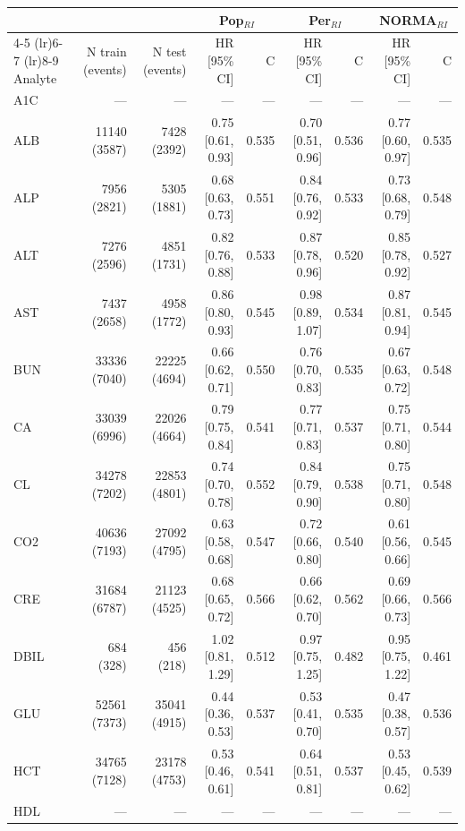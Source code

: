\begin{table}[ht]
\centering
\footnotesize
\begin{tabular}{lrrrrrrrr}
\toprule
 & &  & \multicolumn{2}{c}{Pop$_{RI}$} & \multicolumn{2}{c}{Per$_{RI}$} & \multicolumn{2}{c}{NORMA$_{RI}$} \\
\cmidrule(lr){4-5} \cmidrule(lr){6-7} \cmidrule(lr){8-9}
Analyte & N train (events) & N test (events) & HR [95\% CI] & C & HR [95\% CI] & C & HR [95\% CI] & C \\
\midrule
A1C & --- & --- & --- & --- & --- & --- & --- & --- \\
ALB & 11140 (3587) & 7428 (2392) & 0.75 [0.61, 0.93] & 0.535 & 0.70 [0.51, 0.96] & 0.536 & 0.77 [0.60, 0.97] & 0.535 \\
ALP & 7956 (2821) & 5305 (1881) & 0.68 [0.63, 0.73] & 0.551 & 0.84 [0.76, 0.92] & 0.533 & 0.73 [0.68, 0.79] & 0.548 \\
ALT & 7276 (2596) & 4851 (1731) & 0.82 [0.76, 0.88] & 0.533 & 0.87 [0.78, 0.96] & 0.520 & 0.85 [0.78, 0.92] & 0.527 \\
AST & 7437 (2658) & 4958 (1772) & 0.86 [0.80, 0.93] & 0.545 & 0.98 [0.89, 1.07] & 0.534 & 0.87 [0.81, 0.94] & 0.545 \\
BUN & 33336 (7040) & 22225 (4694) & 0.66 [0.62, 0.71] & 0.550 & 0.76 [0.70, 0.83] & 0.535 & 0.67 [0.63, 0.72] & 0.548 \\
CA & 33039 (6996) & 22026 (4664) & 0.79 [0.75, 0.84] & 0.541 & 0.77 [0.71, 0.83] & 0.537 & 0.75 [0.71, 0.80] & 0.544 \\
CL & 34278 (7202) & 22853 (4801) & 0.74 [0.70, 0.78] & 0.552 & 0.84 [0.79, 0.90] & 0.538 & 0.75 [0.71, 0.80] & 0.548 \\
CO2 & 40636 (7193) & 27092 (4795) & 0.63 [0.58, 0.68] & 0.547 & 0.72 [0.66, 0.80] & 0.540 & 0.61 [0.56, 0.66] & 0.545 \\
CRE & 31684 (6787) & 21123 (4525) & 0.68 [0.65, 0.72] & 0.566 & 0.66 [0.62, 0.70] & 0.562 & 0.69 [0.66, 0.73] & 0.566 \\
DBIL & 684 (328) & 456 (218) & 1.02 [0.81, 1.29] & 0.512 & 0.97 [0.75, 1.25] & 0.482 & 0.95 [0.75, 1.22] & 0.461 \\
GLU & 52561 (7373) & 35041 (4915) & 0.44 [0.36, 0.53] & 0.537 & 0.53 [0.41, 0.70] & 0.535 & 0.47 [0.38, 0.57] & 0.536 \\
HCT & 34765 (7128) & 23178 (4753) & 0.53 [0.46, 0.61] & 0.541 & 0.64 [0.51, 0.81] & 0.537 & 0.53 [0.45, 0.62] & 0.539 \\
HDL & --- & --- & --- & --- & --- & --- & --- & --- \\

\end{tabular}
\end{table}
